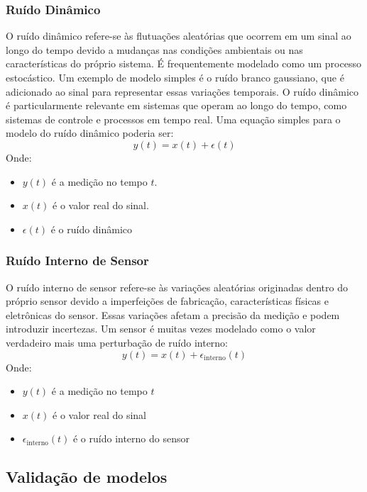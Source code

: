 \documentclass[a4paper,12pt]{article}
\begin{document}
\subsubsection{Ruído Dinâmico}

O ruído dinâmico refere-se às flutuações aleatórias que ocorrem em um sinal ao longo do tempo devido a mudanças nas condições ambientais ou nas características do próprio sistema. É frequentemente modelado como um processo estocástico. Um exemplo de modelo simples é o ruído branco gaussiano, que é adicionado ao sinal para representar essas variações temporais. O ruído dinâmico é particularmente relevante em sistemas que operam ao longo do tempo, como sistemas de controle e processos em tempo real. Uma equação simples para o modelo do ruído dinâmico poderia ser:
\begin{equation}
    y(t) = x(t) + \epsilon(t)\tag{2.9.2.1}
\end{equation}
Onde:
\begin{itemize}
    \item \(y(t)\) é a medição no tempo \(t\).
    \item \(x(t)\) é o valor real do sinal.
    \item \(\epsilon(t)\) é o ruído dinâmico
\end{itemize}

\subsubsection{Ruído Interno de Sensor}

O ruído interno de sensor refere-se às variações aleatórias originadas dentro do próprio sensor devido a imperfeições de fabricação, características físicas e eletrônicas do sensor. Essas variações afetam a precisão da medição e podem introduzir incertezas. Um sensor é muitas vezes modelado como o valor verdadeiro mais uma perturbação de ruído interno:
\begin{equation}
    y(t) = x(t) + \epsilon_{\text{interno}}(t)\tag{2.9.3.1}
\end{equation}
Onde:
\begin{itemize}
    \item \(y(t)\) é a medição no tempo \(t\)
    \item \(x(t)\) é o valor real do sinal
    \item \(\epsilon_{\text{interno}}(t)\) é o ruído interno do sensor
\end{itemize}

\subsection{Validação de modelos}
\end{document}
